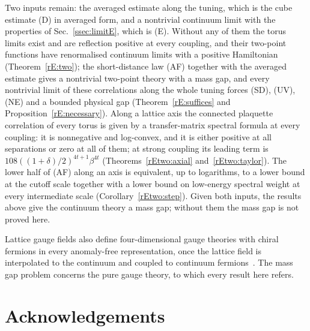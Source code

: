 \documentclass[aps,prd,twocolumn,superscriptaddress,nofootinbib,longbibliography,floatfix,amsmath,amssymb,10pt]{revtex4-2}
\theoremstyle{definition}
\theoremstyle{remark}
\begin{document}
Two inputs remain: the averaged estimate along the tuning, which is the
cube estimate (D) in averaged form, and a nontrivial continuum limit with the
properties of Sec.~\ref{ssec:limitE}, which is (E). Without any of them the torus limits
exist and are reflection positive at every coupling, and their two-point
functions have renormalised continuum limits with a positive Hamiltonian
(Theorem~\ref{rE:two}); the short-distance law (AF) together with the
averaged estimate gives a nontrivial two-point theory with a mass gap, and
every nontrivial limit of these correlations along the whole tuning forces
(SD), (UV), (NE) and a bounded physical gap (Theorem~\ref{rE:suffices} and Proposition~\ref{rE:necessary}).
Along a lattice axis the connected plaquette correlation of every torus is
given by a transfer-matrix spectral formula at every coupling: it is
nonnegative and log-convex, and it is either positive at all separations
or zero at all of them; at strong coupling its leading term is
$108((1+\delta)/2)^{4t+1}\beta^{4t}$ (Theorems~\ref{rEtwo:axial}
and~\ref{rEtwo:taylor}). The lower half of (AF) along an axis is equivalent,
up to logarithms, to a lower bound at the cutoff scale together with a
lower bound on low-energy spectral weight at every intermediate scale
(Corollary~\ref{rEtwo:step}).
Given both inputs, the results above give the continuum theory a mass
gap; without them the mass gap is not proved here.

Lattice gauge fields also define four-dimensional gauge theories with
chiral fermions in every anomaly-free representation, once the lattice
field is interpolated to the continuum and coupled to continuum
fermions~\cite{Wit26}. The mass gap problem concerns the pure gauge
theory, to which every result here refers.

\section*{Acknowledgements}
\end{document}
